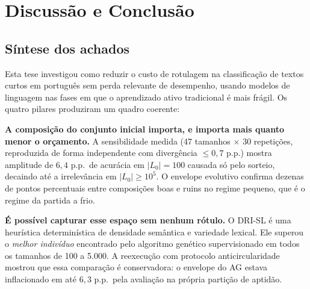 \chapter{Discussão e Conclusão}
\label{ch:conclusao}

\section{Síntese dos achados}
\label{sec:conc-sintese}

Esta tese investigou como reduzir o custo de rotulagem na classificação de
textos curtos em português sem perda relevante de desempenho, usando modelos de
linguagem nas fases em que o aprendizado ativo tradicional é mais frágil. Os
quatro pilares produziram um quadro coerente:

\textbf{A composição do conjunto inicial importa, e importa mais quanto
menor o orçamento.} A sensibilidade medida (47 tamanhos $\times$ 30
repetições, reproduzida de forma independente com divergência $\le 0{,}7$
p.p.) mostra amplitude de $6{,}4$ p.p.\ de acurácia em $|L_0|=100$ causada só
pelo sorteio, decaindo até a irrelevância em $|L_0| \ge 10^5$. O envelope
evolutivo confirma dezenas de pontos percentuais entre composições boas e
ruins no regime pequeno, que é o regime da partida a frio.

\textbf{É possível capturar esse espaço sem nenhum rótulo.} O DRI-SL é uma
heurística determinística de densidade semântica e variedade lexical. Ele superou o \emph{melhor
indivíduo} encontrado pelo algoritmo genético supervisionado em todos os
tamanhos de 100 a 5.000. A reexecução com protocolo anticircularidade mostrou
que essa comparação é conservadora: o envelope do AG estava inflacionado em
até $6{,}3$ p.p.\ pela avaliação na própria partição de aptidão.

